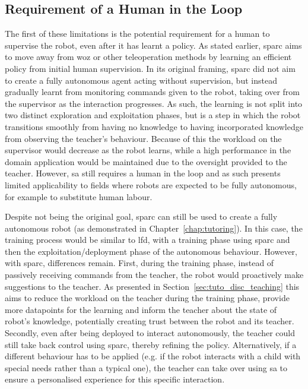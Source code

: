 \subsection{Requirement of a Human in the Loop}

The first of these limitations is the potential requirement for a human to supervise the robot, even after it has learnt a policy. As stated earlier, \gls{sparc} aims to move away from \gls{woz} or other teleoperation methods by learning an efficient policy from initial human supervision. In its original framing, \gls{sparc} did not aim to create a fully autonomous agent acting without supervision, but instead gradually learnt from monitoring commands given to the robot, taking over from the supervisor as the interaction progresses. As such, the learning is not split into two distinct exploration and exploitation phases, but is a step in which the robot transitions smoothly from having no knowledge to having incorporated knowledge from observing the teacher's behaviour. Because of this the workload on the supervisor would decrease as the robot learns, while a high performance in the domain application would be maintained due to the oversight provided to the teacher. However, \gls{sa} still requires a human in the loop and as such presents limited applicability to fields where robots are expected to be fully autonomous, for example to substitute human labour. 

Despite not being the original goal, \gls{sparc} can still be used to create a fully autonomous robot (as demonstrated in Chapter~\ref{chap:tutoring}). In this case, the training process would be similar to \gls{lfd}, with a training phase using \gls{sparc} and then the exploitation/deployment phase of the autonomous behaviour. However, with \gls{sparc}, differences remain. First, during the training phase, instead of passively receiving commands from the teacher, the robot would proactively make suggestions to the teacher. As presented in Section~\ref{sec:tuto_disc_teaching} this aims to reduce the workload on the teacher during the training phase, provide more datapoints for the learning and inform the teacher about the state of robot's knowledge, potentially creating trust between the robot and its teacher. Secondly, even after being deployed to interact autonomously, the teacher could still take back control using \gls{sparc}, thereby refining the policy. Alternatively, if a different behaviour has to be applied (e.g. if the robot interacts with a child with special needs rather than a typical one), the teacher can take over using \gls{sa} to ensure a personalised experience for this specific interaction.


